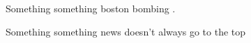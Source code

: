 \lipsum[1]

Something something boston bombing \cite{Potts:2013:IRC:2507065.2507079}.

Something something news doesn't always go to the top \cite{Gilbert:2013:WUR:2441776.2441866}
